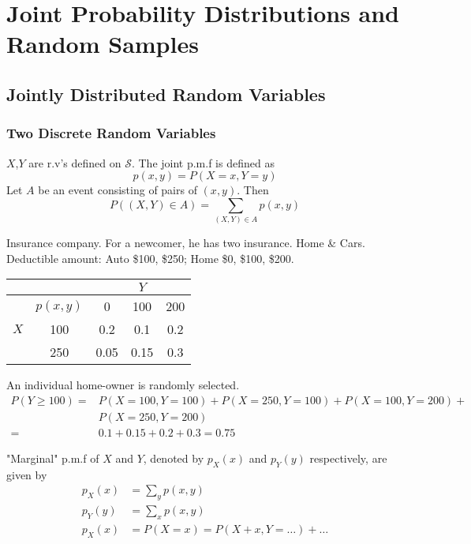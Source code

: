 \chapter[Joint Probability Distributions]{Joint Probability Distributions and Random Samples}
\section{Jointly Distributed Random Variables}
\subsection{Two Discrete Random Variables}
$X$,$Y$ are r.v's defined on $\mathcal{S}$. The joint p.m.f is defined as 
\[p(x,y)=P(X=x,Y=y)\]
Let $A$ be an event consisting of pairs of $(x,y)$. Then
\[P\left((X,Y)\in A\right) = \sum_{(X,Y)\in A}p(x,y)\]

\begin{exmp}
Insurance company. For a newcomer, he has two insurance. Home \& Cars. Deductible amount: Auto \$100, \$250; Home \$0, \$100, \$200.
\begin{center}
\begin{tabular}{c|c|ccc}
\hline  \hline
    &     &    & $Y$ &   \\
\hline
    & $p(x,y)$ & 0    & 100  & 200  \\
$X$ & 100      & 0.2  & 0.1  & 0.2  \\
    & 250      & 0.05 & 0.15 & 0.3  \\
\hline
\end{tabular}
\end{center}
An individual home-owner is randomly selected.
\begin{align*}
P(Y \geq 100)=& P(X=100, Y=100)+P(X=250, Y=100)+P(X=100, Y=200)+\\
&P(X=250, Y=200)\\
=& 0.1+0.15+0.2+0.3=0.75
\end{align*}
\end{exmp}

\begin{defn}
"Marginal" p.m.f of $X$ and $Y$, denoted by $p_X(x)$ and $p_Y(y)$ respectively, are given by
\begin{align*}
p_X(x)&=\sum_{y}p(x,y)	\\
p_Y(y)&=\sum_{x}p(x,y)	\\
p_X(x)&=P(X=x)=P(X+x,Y=\dots)+\dots
\end{align*}
\end{defn}

